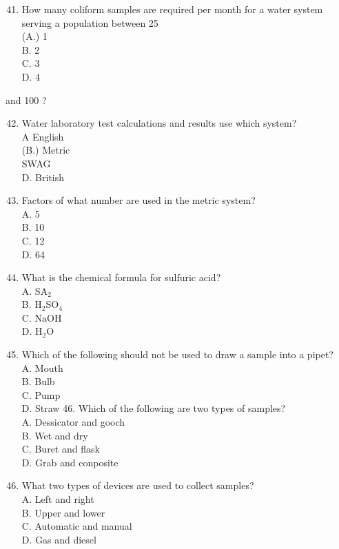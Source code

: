 \documentclass[10pt]{article}
\begin{document}
\begin{enumerate}
  \setcounter{enumi}{40}
  \item How many coliform samples are required per month for a water system serving a population between 25\\
(A.) 1\\
B. 2\\
C. 3\\
D. 4
\end{enumerate}

and 100 ?

\begin{enumerate}
  \setcounter{enumi}{41}
  \item Water laboratory test calculations and results use which system?\\
A English\\
(B.) Metric\\
SWAG\\
D. British

  \item Factors of what number are used in the metric system?\\
A. 5\\
B. 10\\
C. 12\\
D. 64

  \item What is the chemical formula for sulfuric acid?\\
A. $\mathrm{SA}_{2}$\\
B. $\mathrm{H}_{2} \mathrm{SO}_{4}$\\
C. $\mathrm{NaOH}$\\
D. $\mathrm{H}_{2} \mathrm{O}$

  \item Which of the following should not be used to draw a sample into a pipet?\\
A. Mouth\\
B. Bulb\\
C. Pump\\
D. Straw 46. Which of the following are two types of samples?\\
A. Dessicator and gooch\\
B. Wet and dry\\
C. Buret and flask\\
D. Grab and conposite

  \item What two types of devices are used to collect samples?\\
A. Left and right\\
B. Upper and lower\\
C. Automatic and manual\\
D. Gas and diesel


\end{enumerate}
\end{document}
